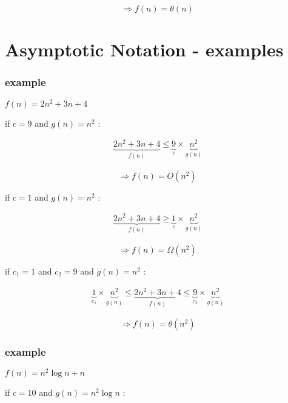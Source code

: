 \documentclass[12pt]{article}
\begin{document}
$$
\Rightarrow f(n) = \theta(n)
$$



\section{Asymptotic Notation - examples}







\subsubsection{example}


$f(n) = 2n^{2} + 3n + 4$

if $c = 9$ and $g(n) = n^{2}$ :

\begin{align*}
\underbrace{2n^{2} + 3n + 4}_{f(n)} \leq \underbrace{9}_{c} \times \underbrace{n^{2}}_{g(n)} 
\end{align*}

$$
\Rightarrow f(n) = O(n^{2})
$$



if $c = 1$ and $g(n) = n^{2}$ :

\begin{align*}
\underbrace{2n^{2} + 3n + 4}_{f(n)} \geq \underbrace{1}_{c} \times \underbrace{n^{2}}_{g(n)} 
\end{align*}

$$
\Rightarrow f(n) = \Omega(n^{2})
$$


if $c_{1} = 1$ and  $c_{2} = 9$ and $g(n) = n^{2}$ :

\begin{align*}
\underbrace{1}_{c_{1}} \times \underbrace{n^{2}}_{g(n)}  \leq  \underbrace{2n^{2} + 3n + 4}_{f(n)} \leq \underbrace{9}_{c_{2}} \times \underbrace{n^{2}}_{g(n)} 
\end{align*}

$$
\Rightarrow f(n) = \theta(n^{2})
$$











\subsubsection{example}


$f(n) = n^{2}\log{n} + n$

if $c = 10$ and $g(n) = n^{2}\log{n}$ :
\end{document}
